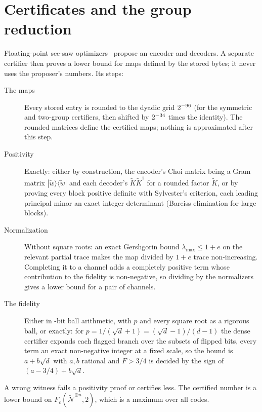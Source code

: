 \documentclass[aps,pra,twocolumn,superscriptaddress,nofootinbib,longbibliography,floatfix]{revtex4-2}
\newcommand{\proj}[1]{|#1\rangle\langle #1|}
\newcommand{\nt}{\widetilde{\mathcal N}}
\begin{document}
\section{Certificates and the group reduction}
\label{sec:certs}

Floating-point see-saw optimizers~\cite{reimpell2005iterative} propose an encoder and decoders. A separate certifier then proves a lower bound for maps defined by the stored bytes; it never uses the proposer's numbers. Its steps:
\begin{description}
\item[The maps] Every stored entry is rounded to the dyadic grid $2^{-96}$ (for the symmetric and two-group certifiers, then shifted by $2^{-34}$ times the identity). The rounded matrices define the certified maps; nothing is approximated after this step.
\item[Positivity] Exactly: either by construction, the encoder's Choi matrix being a Gram matrix $\proj{\tilde w}$ and each decoder's $\tilde K\tilde K^\dagger$ for a rounded factor $\tilde K$, or by proving every block positive definite with Sylvester's criterion, each leading principal minor an exact integer determinant (Bareiss elimination for large blocks).
\item[Normalization] Without square roots: an exact Gershgorin bound $\lambda_{\max}\le1+e$ on the relevant partial trace makes the map divided by $1+e$ trace non-increasing. Completing it to a channel adds a completely positive term whose contribution to the fidelity is non-negative, so dividing by the normalizers gives a lower bound for a pair of channels.
\item[The fidelity] Either in \PrecBits-bit ball arithmetic, with $p$ and every square root as a rigorous ball, or exactly: for $p=1/(\sqrt d+1)=(\sqrt d-1)/(d-1)$ the dense certifier expands each flagged branch over the subsets of flipped bits, every term an exact non-negative integer at a fixed scale, so the bound is $a+b\sqrt d$ with $a,b$ rational and $F>3/4$ is decided by the sign of $(a-3/4)+b\sqrt d$.
\end{description}
A wrong witness fails a positivity proof or certifies less. The certified number is a lower bound on $F_c(\nt^{\otimes n},2)$, which is a maximum over all codes.
\end{document}
